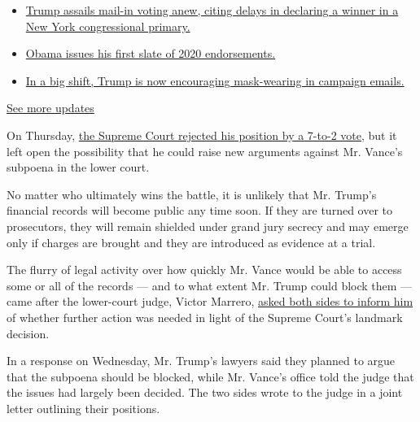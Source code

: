 \begin{itemize}
\tightlist
\item
  \href{https://www.nytimes3xbfgragh.onion/2020/08/03/us/elections/biden-vs-trump.html?action=click\&pgtype=Article\&state=default\&region=MAIN_CONTENT_1\&context=storylines_live_updates\#link-6494b448}{Trump
  assails mail-in voting anew, citing delays in declaring a winner in a
  New York congressional primary.}
\item
  \href{https://www.nytimes3xbfgragh.onion/2020/08/03/us/elections/biden-vs-trump.html?action=click\&pgtype=Article\&state=default\&region=MAIN_CONTENT_1\&context=storylines_live_updates\#link-3de249e6}{Obama
  issues his first slate of 2020 endorsements.}
\item
  \href{https://www.nytimes3xbfgragh.onion/2020/08/03/us/elections/biden-vs-trump.html?action=click\&pgtype=Article\&state=default\&region=MAIN_CONTENT_1\&context=storylines_live_updates\#link-54e34d20}{In
  a big shift, Trump is now encouraging mask-wearing in campaign
  emails.}
\end{itemize}

\href{https://www.nytimes3xbfgragh.onion/2020/08/03/us/elections/biden-vs-trump.html?action=click\&pgtype=Article\&state=default\&region=MAIN_CONTENT_1\&context=storylines_live_updates}{See
more updates}

On Thursday,
\href{https://www.nytimes3xbfgragh.onion/2020/07/09/us/trump-taxes-supreme-court.html}{the
Supreme Court rejected his position by a 7-to-2 vote}, but it left open
the possibility that he could raise new arguments against Mr. Vance's
subpoena in the lower court.

No matter who ultimately wins the battle, it is unlikely that Mr.
Trump's financial records will become public any time soon. If they are
turned over to prosecutors, they will remain shielded under grand jury
secrecy and may emerge only if charges are brought and they are
introduced as evidence at a trial.

The flurry of legal activity over how quickly Mr. Vance would be able to
access some or all of the records --- and to what extent Mr. Trump could
block them --- came after the lower-court judge, Victor Marrero,
\href{https://www.nytimes3xbfgragh.onion/2020/07/10/nyregion/donald-trump-taxes-cy-vance.html}{asked
both sides to inform him} of whether further action was needed in light
of the Supreme Court's landmark decision.

In a response on Wednesday, Mr. Trump's lawyers said they planned to
argue that the subpoena should be blocked, while Mr. Vance's office told
the judge that the issues had largely been decided. The two sides wrote
to the judge in a joint letter outlining their positions.

